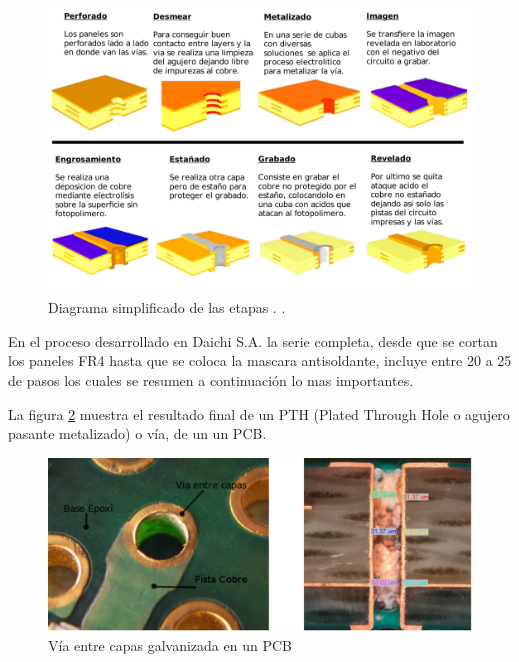 \begin{figure}[h]
	\centering
	\includegraphics[width=1.0\textwidth]{Figures/Cap_2/diagrama_galvanizado_completo}
	\caption{ Diagrama simplificado de las etapas \footnotemark. \footnotemark.}
	\label{fig:diagrama_proceso}
\end{figure}


En el proceso desarrollado en Daichi S.A. la serie completa, desde que se cortan los paneles FR4 hasta que se coloca la mascara antisoldante, incluye entre 20 a 25 de pasos los cuales se resumen a continuación lo mas importantes.

La figura \ref{fig:galvanizado_pcb} muestra el resultado final de un PTH (Plated Through Hole o agujero pasante metalizado) o  vía, de un un PCB.
\begin{figure}[h]
	\centering
	\includegraphics[width=.8\textwidth]{Figures/Cap_2/galvanizado_pcb_2}
	\caption{Vía entre capas galvanizada en un PCB}
	\label{fig:galvanizado_pcb}
\end{figure}

